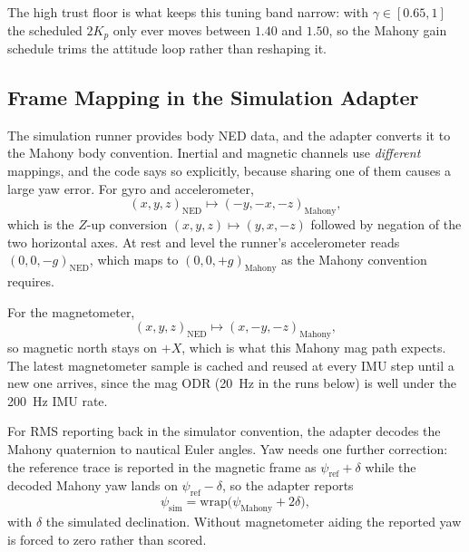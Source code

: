 \documentclass[conference]{IEEEtran}
\begin{document}
    The high trust floor is what keeps this tuning band narrow: with
    \(\gamma\in[0.65,1]\) the scheduled \(2K_p\) only ever moves between
    \(1.40\) and \(1.50\), so the Mahony gain schedule trims the attitude loop
    rather than reshaping it.

    \subsection{Frame Mapping in the Simulation Adapter}

    The simulation runner provides body NED data, and the adapter converts it to
    the Mahony body convention. Inertial and magnetic channels use
    \emph{different} mappings, and the code says so explicitly, because sharing
    one of them causes a large yaw error. For gyro and accelerometer,
    \begin{equation}
    (x,y,z)_{\mathrm{NED}}
    \mapsto
    (-y,-x,-z)_{\mathrm{Mahony}},
    \end{equation}
    which is the \(Z\)-up conversion \((x,y,z)\mapsto(y,x,-z)\) followed by
    negation of the two horizontal axes. At rest and level the runner's
    accelerometer reads \((0,0,-g)_{\mathrm{NED}}\), which maps to
    \((0,0,+g)_{\mathrm{Mahony}}\) as the Mahony convention requires.

    For the magnetometer,
    \begin{equation}
    (x,y,z)_{\mathrm{NED}}
    \mapsto
    (x,-y,-z)_{\mathrm{Mahony}},
    \end{equation}
    so magnetic north stays on \(+X\), which is what this Mahony mag path
    expects. The latest magnetometer sample is cached and reused at every IMU
    step until a new one arrives, since the mag ODR (\SI{20}{Hz} in the runs
    below) is well under the \SI{200}{Hz} IMU rate.

    For RMS reporting back in the simulator convention, the adapter decodes the
    Mahony quaternion to nautical Euler angles. Yaw needs one further
    correction: the reference trace is reported in the magnetic frame as
    \(\psi_{\mathrm{ref}}+\delta\) while the decoded Mahony yaw lands on
    \(\psi_{\mathrm{ref}}-\delta\), so the adapter reports
    \begin{equation}
        \psi_{\mathrm{sim}} = \mathrm{wrap}\bigl(\psi_{\mathrm{Mahony}}
        + 2\delta\bigr),
    \end{equation}
    with \(\delta\) the simulated declination. Without magnetometer aiding the
    reported yaw is forced to zero rather than scored.
\end{document}
